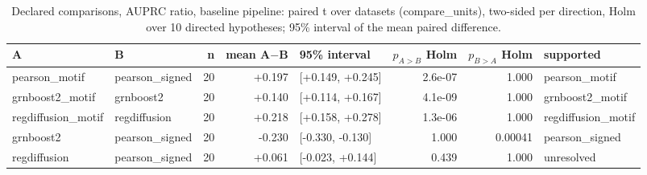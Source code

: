 \begin{table}[H]\centering\small
\caption{Declared comparisons, AUPRC ratio, baseline pipeline: paired t over datasets (compare\_units), two-sided per direction, Holm over 10 directed hypotheses; 95\% interval of the mean paired difference.}
\begin{tabular}{llrrlrrl}\toprule
A & B & n & mean A$-$B & 95\% interval & $p_{A>B}$ Holm & $p_{B>A}$ Holm & supported \\ \midrule
pearson\_motif & pearson\_signed & 20 & +0.197 & [+0.149, +0.245] & 2.6e-07 & 1.000 & pearson\_motif \\
grnboost2\_motif & grnboost2 & 20 & +0.140 & [+0.114, +0.167] & 4.1e-09 & 1.000 & grnboost2\_motif \\
regdiffusion\_motif & regdiffusion & 20 & +0.218 & [+0.158, +0.278] & 1.3e-06 & 1.000 & regdiffusion\_motif \\
grnboost2 & pearson\_signed & 20 & -0.230 & [-0.330, -0.130] & 1.000 & 0.00041 & pearson\_signed \\
regdiffusion & pearson\_signed & 20 & +0.061 & [-0.023, +0.144] & 0.439 & 1.000 & unresolved \\
\bottomrule\end{tabular}\end{table}
